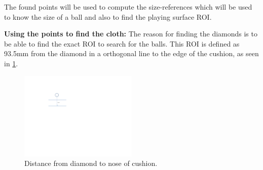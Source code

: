The found points will be used to compute the size-references which will be used to know the size of a ball and also to find the playing surface ROI.




\textbf{Using the points to find the cloth:}
The reason for finding the diamonds is to be able to find the exact ROI to search for the balls. This ROI is defined as 93.5mm from the diamond in a orthogonal line to the edge of the cushion, as seen in \ref{fig:diamonddistance}.

\begin{figure}[H]
\begin{center}
\leavevmode
\includegraphics[width=0.5\textwidth]{images/diamonddistance.pdf }
\end{center}
\caption{Distance from diamond to nose of cushion.}
\label{fig:diamonddistance}
\end{figure}

